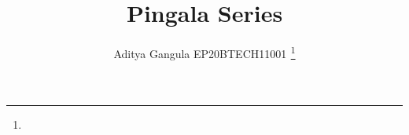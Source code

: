 \documentclass[journal,12pt,twocolumn]{IEEEtran}
\begin{document}
\let\StandardTheFigure\thefigure
\renewcommand{\thefigure}{\theproblem}



\def\putbox#1#2#3{\makebox[0in][l]{\makebox[#1][l]{}\raisebox{\baselineskip}[0in][0in]{\raisebox{#2}[0in][0in]{#3}}}}
     \def\rightbox#1{\makebox[0in][r]{#1}}
     \def\centbox#1{\makebox[0in]{#1}}
     \def\topbox#1{\raisebox{-\baselineskip}[0in][0in]{#1}}
     \def\midbox#1{\raisebox{-0.5\baselineskip}[0in][0in]{#1}}

\vspace{3cm}

\title{ 
Pingala Series
}


%
%
%

\author{ Aditya Gangula EP20BTECH11001$^{}$ %
\thanks{}%
}
% 
%
\end{document}
